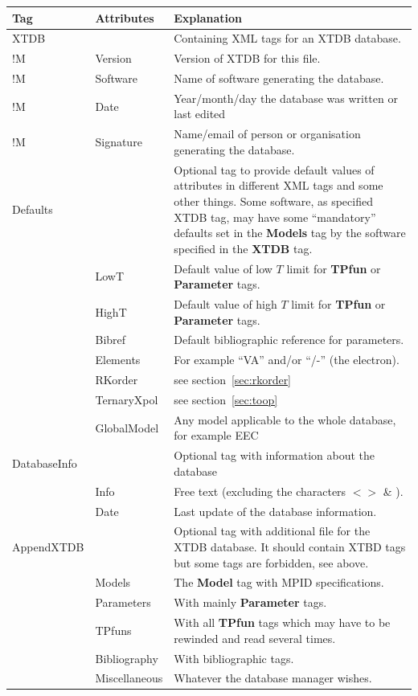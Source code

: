 \documentclass{article}
\begin{document}
\begin{tabular}{|p{} p{} p{}|}\hline
  Tag & Attributes & Explanation\\\hline

XTDB    &         & Containing XML tags for an XTDB database.\\
!M      & Version & Version of XTDB for this file.\\
!M      &Software & Name of software generating the database.\\
!M      &Date     & Year/month/day the database was written or last edited\\
!M      &Signature & Name/email of person or organisation generating the database.\\\hline
  
Defaults & & Optional tag to provide default values of attributes in
             different XML tags and some other things.  Some software, as
             specified XTDB tag,  may have some ``mandatory'' defaults
             set in the {\bf Models} tag by the software specified in the
             {\bf XTDB} tag.\\
         & LowT & Default value of low $T$ limit for {\bf TPfun} or 
                 {\bf Parameter} tags.\\
         & HighT & Default value of high $T$ limit for {\bf TPfun} or 
                 {\bf Parameter} tags.\\
         & Bibref & Default bibliographic reference for parameters. \\
         & Elements & For example ``VA'' and/or ``/-'' (the electron).\\
         & RKorder & see section~\ref{sec:rkorder} \\
         & TernaryXpol & see section~\ref{sec:toop} \\
         & GlobalModel & Any model applicable to the whole database,
                 for example EEC~\cite{21Sun}\\\hline

DatabaseInfo & & Optional tag with information about the database\\
         & Info & Free text (excluding the characters $< >$ \& ).\\
         & Date & Last update of the database information.\\\hline

AppendXTDB & & Optional tag with additional file for the XTDB database.  
              It should contain XTBD tags but some tags are forbidden,
              see above.\\
         & Models & The {\bf Model} tag with MPID specifications.\\
         & Parameters & With mainly {\bf Parameter} tags.\\
         & TPfuns & With all {\bf TPfun} tags which may have to be rewinded and
                    read several times.\\
         & Bibliography & With bibliographic tags.\\
         & Miscellaneous & Whatever the database manager wishes.\\\hline
\end{tabular}
\end{document}
